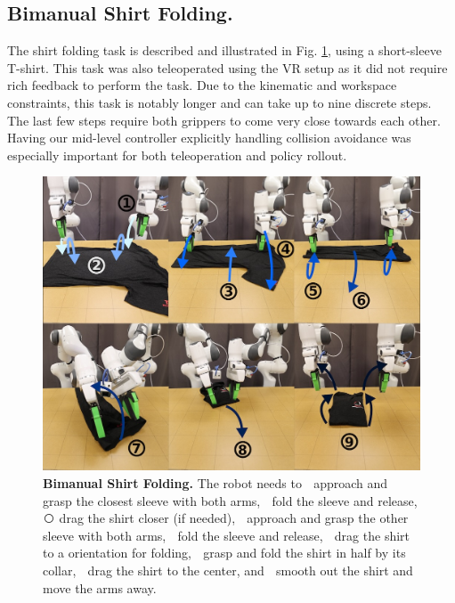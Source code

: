 \documentclass[Afour,sageh,times]{sagej}
\begin{document}
\subsection{Bimanual Shirt Folding.}
The shirt folding task is described and illustrated in Fig. \ref{fig:real_fold_shirt}, using a short-sleeve T-shirt. This task was also teleoperated using the VR setup as it did not require rich
feedback to perform the task. Due to the kinematic and workspace constraints, this task is notably longer and can take up to nine discrete steps. The last few steps require both grippers to come very close towards each other. Having our mid-level controller explicitly handling collision avoidance was especially important for both teleoperation and policy rollout. 

\begin{figure}[t]
\centering
\includegraphics[width=\linewidth]{figure/real_fold_shirt_setup.jpg}
\caption{\textbf{Bimanual Shirt Folding. } 
\label{fig:real_fold_shirt}
The robot needs to
\textcircled{} approach and grasp the closest sleeve with both arms,
\textcircled{} fold the sleeve and release,
\textcircled{} drag the shirt closer (if needed),
\textcircled{} approach and grasp the other sleeve with both arms,
\textcircled{} fold the sleeve and release,
\textcircled{} drag the shirt to a orientation for folding,
\textcircled{} grasp and fold the shirt in half by its collar,
\textcircled{} drag the shirt to the center, and
\textcircled{} smooth out the shirt and move the arms away.
}
\vspace{-4mm}
\end{figure}
\end{document}
